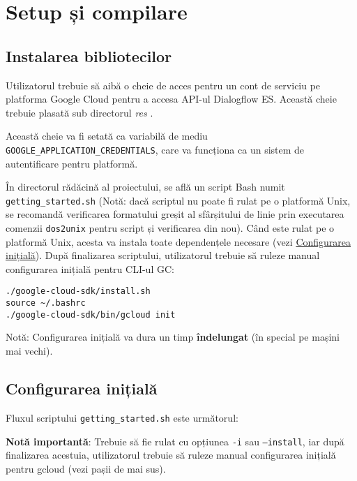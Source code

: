 \chapter{Setup și compilare}

\section{Instalarea bibliotecilor}
Utilizatorul trebuie să aibă o cheie de acces pentru un cont de serviciu pe platforma Google Cloud pentru a accesa API-ul Dialogflow ES. Această cheie trebuie plasată sub directorul \emph{res} \cite{keys-create-delete}.

Această cheie va fi setată ca variabilă de mediu \texttt{GOOGLE\_APPLICATION\_CREDENTIALS}, care va funcționa ca un sistem de autentificare pentru platformă.

În directorul rădăcină al proiectului, se află un script Bash numit \texttt{getting\_started.sh} (Notă: dacă scriptul nu poate fi rulat pe o platformă Unix, se recomandă verificarea formatului greșit al sfârșitului de linie prin executarea comenzii \texttt{dos2unix} pentru script și verificarea din nou). Când este rulat pe o platformă Unix, acesta va instala toate dependențele necesare (vezi \hyperref[first-time-setup]{Configurarea inițială}). După finalizarea scriptului, utilizatorul trebuie să ruleze manual configurarea inițială pentru CLI-ul GC:

\begin{verbatim}
./google-cloud-sdk/install.sh
source ~/.bashrc
./google-cloud-sdk/bin/gcloud init
\end{verbatim}

Notă: Configurarea inițială va dura un timp \textbf{îndelungat} (în special pe mașini mai vechi).

\section{Configurarea inițială}
Fluxul scriptului \texttt{getting\_started.sh} este următorul:

\textbf{Notă importantă}: Trebuie să fie rulat cu opțiunea \texttt{-i} sau \texttt{--install}, iar după finalizarea acestuia, utilizatorul trebuie să ruleze manual configurarea inițială pentru gcloud (vezi pașii de mai sus).

